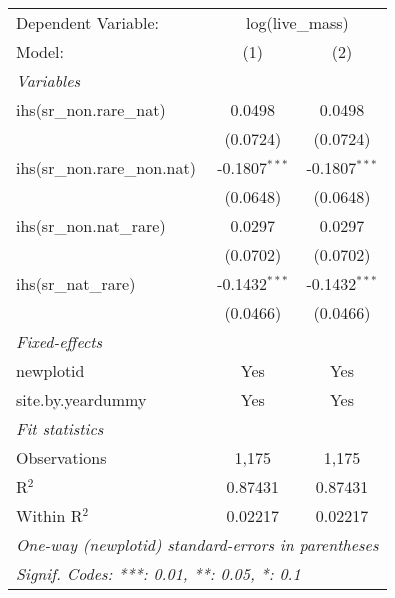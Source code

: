 \begin{tabular}{lcc}
\tabularnewline\midrule\midrule
Dependent Variable:&\multicolumn{2}{c}{log(live\_mass)}\\
Model:&(1) & (2)\\
\midrule \emph{Variables}&   &  \\
ihs(sr\_non.rare\_nat)&0.0498 & 0.0498\\
  &(0.0724) & (0.0724)\\
ihs(sr\_non.rare\_non.nat)&-0.1807$^{***}$ & -0.1807$^{***}$\\
  &(0.0648) & (0.0648)\\
ihs(sr\_non.nat\_rare)&0.0297 & 0.0297\\
  &(0.0702) & (0.0702)\\
ihs(sr\_nat\_rare)&-0.1432$^{***}$ & -0.1432$^{***}$\\
  &(0.0466) & (0.0466)\\
\midrule \emph{Fixed-effects}&   &  \\
newplotid & Yes & Yes\\
site.by.yeardummy & Yes & Yes\\
\midrule \emph{Fit statistics}&  & \\
Observations & 1,175&1,175\\
R$^2$ & 0.87431&0.87431\\
Within R$^2$ & 0.02217&0.02217\\
\midrule\midrule\multicolumn{3}{l}{\emph{One-way (newplotid) standard-errors in parentheses}}\\
\multicolumn{3}{l}{\emph{Signif. Codes: ***: 0.01, **: 0.05, *: 0.1}}\\
\end{tabular}


